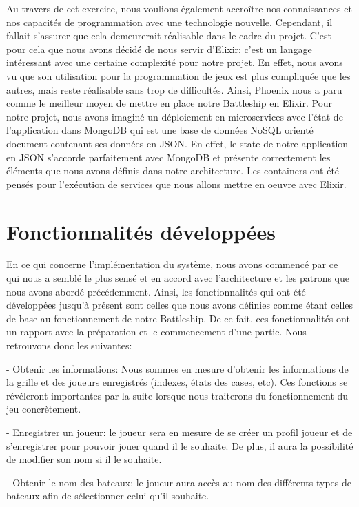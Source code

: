 \documentclass[12pt]{article}
\begin{document}
Au travers de cet exercice, nous voulions également accroître nos connaissances et nos capacités de programmation avec une technologie nouvelle. Cependant, il fallait s'assurer que cela demeurerait réalisable dans le cadre du projet. C'est pour cela que nous avons décidé de nous servir d'Elixir: c'est un langage intéressant avec une certaine complexité pour notre projet. En effet, nous avons vu que son utilisation pour la programmation de jeux est plus compliquée que les autres, mais reste réalisable sans trop de difficultés.
Ainsi, Phoenix nous a paru comme le meilleur moyen de mettre en place notre Battleship en Elixir.
Pour notre projet, nous avons imaginé un déploiement en microservices avec l'état de l'application dans MongoDB qui est une base de données NoSQL orienté document contenant ses données en JSON. En effet, le state de notre application en JSON s'accorde parfaitement avec MongoDB et présente correctement les éléments que nous avons définis dans notre architecture. Les containers ont été pensés pour l'exécution de services que nous allons mettre en oeuvre avec Elixir.

\section{Fonctionnalités développées}

En ce qui concerne l'implémentation du système, nous avons commencé par ce qui nous a semblé le plus sensé et en accord avec l'architecture et les patrons que nous avons abordé précédemment. Ainsi, les fonctionnalités qui ont été développées jusqu'à présent sont celles que nous avons définies comme étant celles de base au fonctionnement de notre Battleship. De ce fait, ces fonctionnalités ont un rapport avec la préparation et le commencement d'une partie. Nous retrouvons donc les suivantes:

- Obtenir les informations: Nous sommes en mesure d'obtenir les informations de la grille et des joueurs enregistrés (indexes, états des cases, etc). Ces fonctions se révéleront importantes par la suite lorsque nous traiterons du fonctionnement du jeu concrètement.

- Enregistrer un joueur: le joueur sera en mesure de se créer un profil joueur et de s'enregistrer pour pouvoir jouer quand il le souhaite. De plus, il aura la possibilité de modifier son nom si il le souhaite.

- Obtenir le nom des bateaux: le joueur aura accès au nom des différents types de bateaux afin de sélectionner celui qu'il souhaite.
\end{document}
